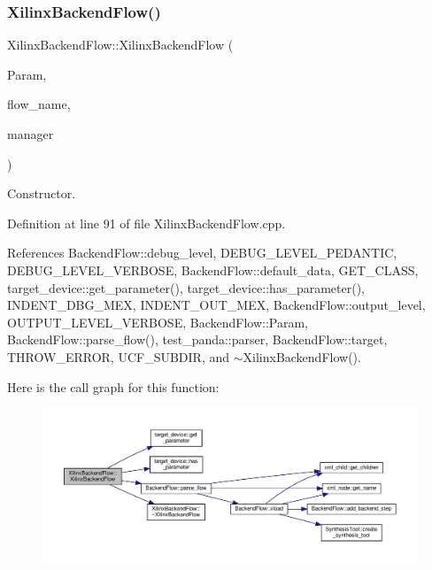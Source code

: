 \subsubsection{\texorpdfstring{Xilinx\+Backend\+Flow()}{XilinxBackendFlow()}}
{\footnotesize\ttfamily Xilinx\+Backend\+Flow\+::\+Xilinx\+Backend\+Flow (\begin{DoxyParamCaption}\item[{const \hyperlink{Parameter_8hpp_a37841774a6fcb479b597fdf8955eb4ea}{Parameter\+Const\+Ref}}]{Param,  }\item[{const std\+::string \&}]{flow\+\_\+name,  }\item[{const \hyperlink{target__manager_8hpp_aee0b586a84fb6eb4faefa6e41e1735a9}{target\+\_\+manager\+Ref}}]{manager }\end{DoxyParamCaption})}



Constructor. 



Definition at line 91 of file Xilinx\+Backend\+Flow.\+cpp.



References Backend\+Flow\+::debug\+\_\+level, D\+E\+B\+U\+G\+\_\+\+L\+E\+V\+E\+L\+\_\+\+P\+E\+D\+A\+N\+T\+IC, D\+E\+B\+U\+G\+\_\+\+L\+E\+V\+E\+L\+\_\+\+V\+E\+R\+B\+O\+SE, Backend\+Flow\+::default\+\_\+data, G\+E\+T\+\_\+\+C\+L\+A\+SS, target\+\_\+device\+::get\+\_\+parameter(), target\+\_\+device\+::has\+\_\+parameter(), I\+N\+D\+E\+N\+T\+\_\+\+D\+B\+G\+\_\+\+M\+EX, I\+N\+D\+E\+N\+T\+\_\+\+O\+U\+T\+\_\+\+M\+EX, Backend\+Flow\+::output\+\_\+level, O\+U\+T\+P\+U\+T\+\_\+\+L\+E\+V\+E\+L\+\_\+\+V\+E\+R\+B\+O\+SE, Backend\+Flow\+::\+Param, Backend\+Flow\+::parse\+\_\+flow(), test\+\_\+panda\+::parser, Backend\+Flow\+::target, T\+H\+R\+O\+W\+\_\+\+E\+R\+R\+OR, U\+C\+F\+\_\+\+S\+U\+B\+D\+IR, and $\sim$\+Xilinx\+Backend\+Flow().

Here is the call graph for this function\+:
\nopagebreak
\begin{figure}[H]
\begin{center}
\leavevmode
\includegraphics[width=350pt]{d6/d94/classXilinxBackendFlow_af4ee34fb087640152ee3e79f7153b0ab_cgraph}
\end{center}
\end{figure}
\mbox{\label{classXilinxBackendFlow_ab9993332094e8d1090c00ba110fe82e1}} 
